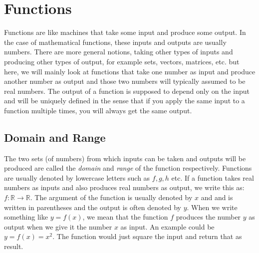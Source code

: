 \section{Functions}
Functions are like machines that take some input and produce some output. In the case of mathematical functions, these inputs and outputs are usually numbers. There are more general notions, taking other types of inputs and producing other types of output, for example sets, vectors, matrices, etc. but here, we will mainly look at functions that take one number as input and produce another number as output and those two numbers will typically assumed to be real numbers. The output of a function is supposed to depend only on the input and will be uniquely defined in the sense that if you apply the same input to a function multiple times, you will always get the same output. 


\subsection{Domain and Range}
The two sets (of numbers) from which inputs can be taken and outputs will be produced are called the \emph{domain} and \emph{range} of the function respectively. Functions are usually denoted by lowercase letters such as $f,g,h$ etc. If a function takes real numbers as inputs and also produces real numbers as output, we write this as: $f: \mathbb{R} \rightarrow \mathbb{R}$. The argument of the function is usually denoted by $x$ and and is written in parentheses and the output is often denoted by $y$. When we write something like $y = f(x)$, we mean that the function $f$ produces the number $y$ as output when we give it the number $x$ as input. An example could be $y = f(x) = x^2$. The function would just square the input and return that as result. 

